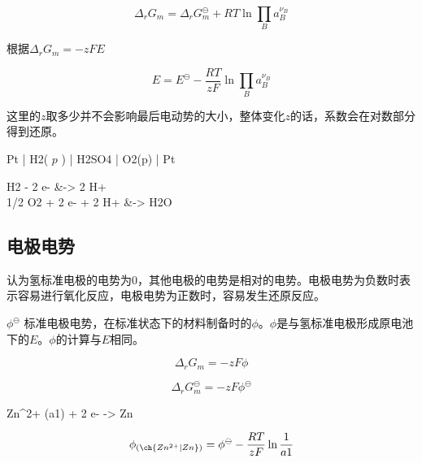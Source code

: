     \begin{equation*}
        \Delta_r G_m = \Delta_r G_m ^\ominus + RT\ln \prod _{B} a_B^{\nu_B}
    \end{equation*}

    根据$\Delta_r G_m = -zFE$

    \begin{equation*}
        E = E^\ominus - \frac{RT}{zF} \ln \prod _{B} a_B^{\nu_B}
    \end{equation*}

    这里的$z$取多少并不会影响最后电动势的大小，整体变化$z$的话，系数会在对数部分得到还原。

    \begin{reaction*}
        Pt | H2( $p$ ) | H2SO4 | O2(p) | Pt
    \end{reaction*}


    \begin{reactions*}
        H2 - 2 e- &-> 2 H+ \\
        1/2 O2 + 2 e- + 2 H+ &-> H2O
    \end{reactions*}

    \subsection{电极电势}

    认为氢标准电极的电势为0，其他电极的电势是相对的电势。电极电势为负数时表示容易进行氧化反应，电极电势为正数时，容易发生还原反应。

    $\phi^{\ominus}$ 标准电极电势，在标准状态下的材料制备时的$\phi$。$\phi$是与氢标准电极形成原电池下的$E$。$\phi$的计算与$E$相同。

    \begin{equation*}
        \Delta_r G_m = -zF\phi
    \end{equation*}

    \begin{equation*}
        \Delta_r G_m ^\ominus = -zF\phi ^\ominus
    \end{equation*}

    \begin{reaction*}
        Zn^{2+} (a1) + 2 e- -> Zn
    \end{reaction*}

    \begin{equation*}
        \phi_{ \left( \ch{Zn^{2+} | Zn} \right) } = \phi^\ominus - \frac{RT}{zF} \ln \frac{1}{a1}
    \end{equation*}